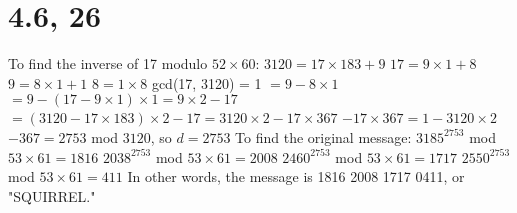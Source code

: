 \documentclass{article}
\begin{document}
\section{4.6, 26}
To find the inverse of 17 modulo $52 \times 60$:
\newline
$3120 = 17 \times 183 + 9$
\newline
$17 = 9 \times 1 + 8$
\newline
$9 = 8 \times 1 + 1$
\newline
$8 = 1 \times 8$
\newline
gcd(17, 3120) = 1
\newline
$= 9 - 8 \times 1$
\newline
$= 9 - (17 - 9 \times 1) \times 1 = 9 \times 2 - 17$
\newline
$= (3120 - 17 \times 183) \times 2 - 17 = 3120 \times 2 - 17 \times 367$
\newline
$-17 \times 367 = 1 - 3120 \times 2$
\newline
$-367 = 2753$ mod $3120$, so $d = 2753$
\newline
\newline
To find the original message:
\newline
$3185^{2753}$ mod $53 \times 61 = 1816$
\newline
$2038^{2753}$ mod $53 \times 61 = 2008$
\newline
$2460^{2753}$ mod $53 \times 61 = 1717$
\newline
$2550^{2753}$ mod $53 \times 61 = 411$
\newline
In other words, the message is 1816 2008 1717 0411, or "SQUIRREL."
\end{document}
